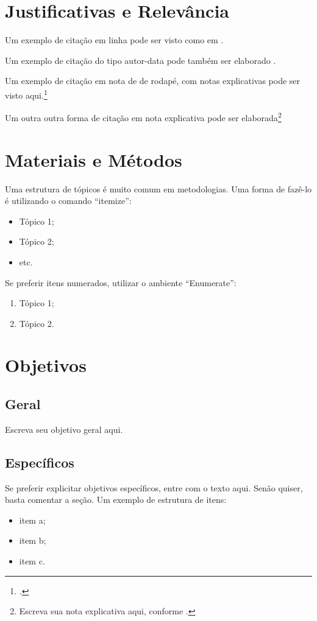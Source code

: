 \documentclass[
	12pt,				%
	openright,			%
	oneside,			%
	a4paper,			%
	english,			%
	brazil				%
	]{abntex2}
\begin{document}
\section{Justificativas e Relevância}

Um exemplo de citação em linha pode ser visto como em \textcite{Einstein1920}.

Um exemplo de citação do tipo autor-data pode também ser elaborado \cite{Einstein1920}.

Um exemplo de citação em nota de de rodapé, com notas explicativas pode ser visto aqui.\footcite[Esta nota vem antes.][p.~22]{descartes-carta-mersene}

Um outra outra forma de citação em nota explicativa pode ser elaborada\footnote{Escreva sua nota explicativa aqui, conforme \textcite{boyle1772}.}

\section{Materiais e Métodos}
Uma estrutura de tópicos é muito comum em metodologias. Uma forma de fazê-lo é utilizando o comando ``itemize'':

\begin{itemize}
	\item Tópico 1;
	\item Tópico 2;
	\item etc.
\end{itemize}

Se preferir itens numerados, utilizar o ambiente ``Enumerate'':
	\begin{enumerate}
	\item Tópico 1;
	\item Tópico 2.
\end{enumerate}

\section{Objetivos}
\subsection*{Geral}
Escreva seu objetivo geral aqui. 
\subsection*{Específicos}
Se preferir explicitar objetivos específicos, entre com o texto aqui. Senão quiser, basta comentar a seção. Um exemplo de estrutura de itens: 
\begin{itemize}
	\item item a;
	\item item b;
	\item item c.
\end{itemize}
\end{document}
